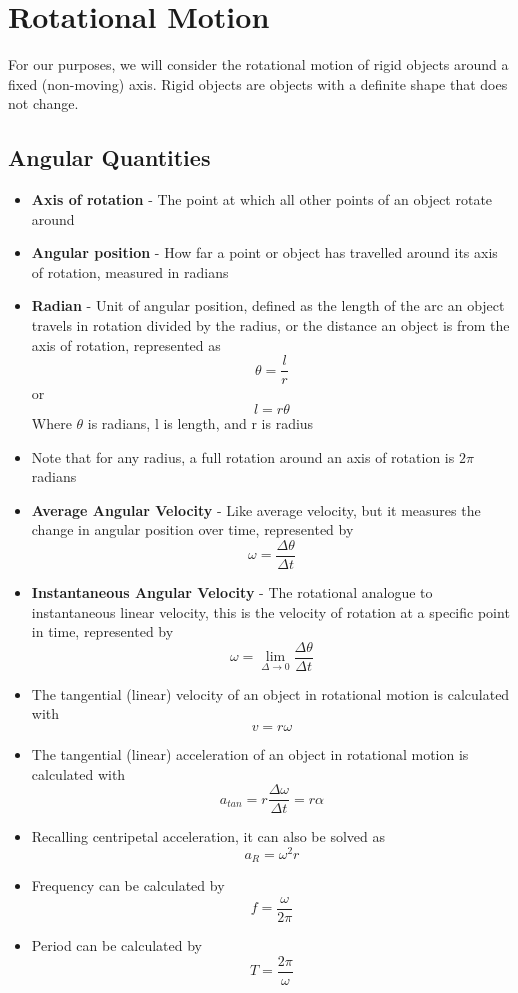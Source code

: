 \section{Rotational Motion}
For our purposes, we will consider the rotational motion of rigid objects around a fixed (non-moving) axis. Rigid objects are objects with a definite shape that does not change.

\subsection{Angular Quantities}
\begin{itemize}
    \item \textbf{Axis of rotation} - The point at which all other points of an object rotate around
    \item \textbf{Angular position} - How far a point or object has travelled around its axis of rotation, measured in radians 
    \item \textbf{Radian} - Unit of angular position, defined as the length of the arc an object travels in rotation divided by the radius, or the distance an object is from the axis of rotation, represented as \[\theta=\frac{l}{r}\] or \[l=r\theta\]Where \(\theta\) is radians, l is length, and r is radius
    \item Note that for any radius, a full rotation around an axis of rotation is \(2\pi\)radians
    \item \textbf{Average Angular Velocity} - Like average velocity, but it measures the change in angular position over time, represented by \[\omega=\frac{\Delta\theta}{\Delta t}\]
    \item \textbf{Instantaneous Angular Velocity} - The rotational analogue to instantaneous linear velocity, this is the velocity of rotation at a specific point in time, represented by \[\omega=\lim_{\Delta \to 0}\frac{\Delta\theta}{\Delta t}\]
    \item The tangential (linear) velocity of an object in rotational motion is calculated with \[v=r\omega\]
    \item The tangential (linear) acceleration of an object in rotational motion is calculated with \[a_{tan}=r\frac{\Delta\omega}{\Delta t}=r\alpha\]
    \item Recalling centripetal acceleration, it can also be solved as \[a_R=\omega^2r\]
    \item Frequency can be calculated by \[f=\frac{\omega}{2\pi}\]
    \item Period can be calculated by \[T=\frac{2\pi}{\omega}\]
\end{itemize}

